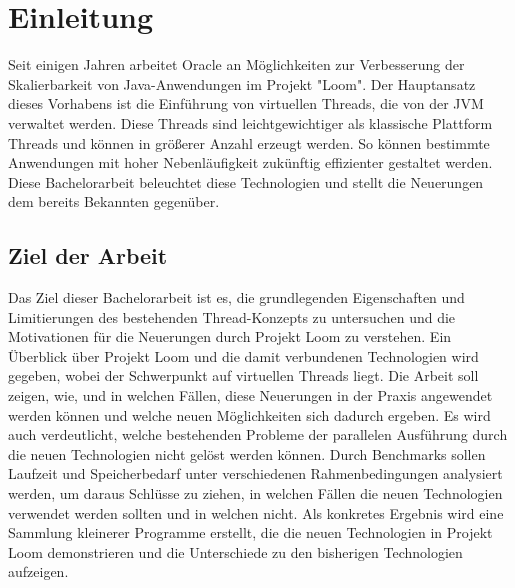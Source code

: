 \chapter{Einleitung}
\label{cha:Einleitung}

    Seit einigen Jahren arbeitet Oracle an Möglichkeiten zur Verbesserung der Skalierbarkeit von Java-Anwendungen im Projekt "Loom".
    Der Hauptansatz dieses Vorhabens ist die Einführung von virtuellen Threads, die von der JVM verwaltet werden. 
    Diese Threads sind leichtgewichtiger als klassische Plattform Threads und können in größerer Anzahl erzeugt werden.
    So können bestimmte Anwendungen mit hoher Nebenläufigkeit zukünftig effizienter gestaltet werden. Diese Bachelorarbeit 
    beleuchtet diese Technologien und stellt die Neuerungen dem bereits Bekannten gegenüber.

\section{Ziel der Arbeit}
\label{sec:Ziel}

    Das Ziel dieser Bachelorarbeit ist es, die grundlegenden Eigenschaften und Limitierungen des bestehenden Thread-Konzepts zu untersuchen und die Motivationen für die Neuerungen
    durch Projekt Loom zu verstehen. Ein Überblick über Projekt Loom und die damit verbundenen Technologien wird gegeben, wobei der Schwerpunkt auf virtuellen Threads liegt. 
    Die Arbeit soll zeigen, wie, und in welchen Fällen, diese Neuerungen in der Praxis angewendet werden können und welche neuen Möglichkeiten sich dadurch ergeben. 
    Es wird auch verdeutlicht, welche bestehenden Probleme der parallelen Ausführung durch die neuen Technologien nicht gelöst werden können. 
    Durch Benchmarks sollen Laufzeit und Speicherbedarf unter verschiedenen Rahmenbedingungen analysiert werden, um daraus Schlüsse zu ziehen, 
    in welchen Fällen die neuen Technologien verwendet werden sollten und in welchen nicht. Als konkretes Ergebnis wird eine Sammlung kleinerer Programme erstellt, 
    die die neuen Technologien in Projekt Loom demonstrieren und die Unterschiede zu den bisherigen Technologien aufzeigen.



